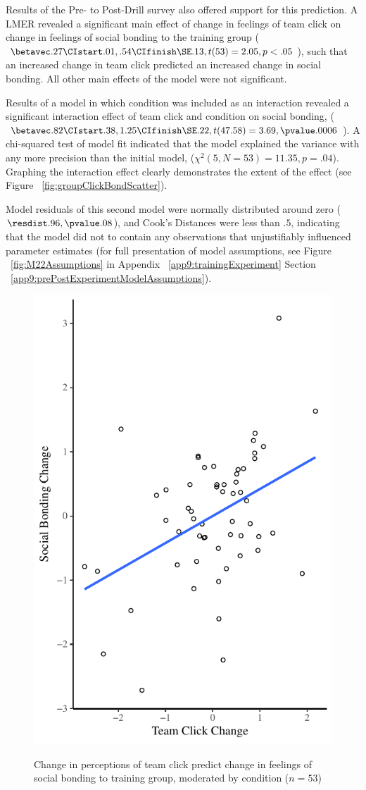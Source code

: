 
Results of the Pre- to Post-Drill survey also offered support for this prediction.  A LMER revealed a significant main effect of change in feelings of team click on change in feelings of social bonding to the training group ($\betavec .27 \CIstart .01, .54 \CIfinish \SE .13, t(53) = 2.05, p < .05$), such that an increased change in team click predicted an increased change in social bonding.  All other main effects of the model were not significant.

Results of a model in which condition was included as an interaction revealed a significant interaction effect of team click and condition on social bonding, ($\betavec .82 \CIstart .38, 1.25 \CIfinish \SE .22, t(47.58) = 3.69, \pvalue .0006$).  A chi-squared test of model fit indicated that the model explained the variance with any more precision than the initial model, ($\chi^2 (5, N = 53) = 11.35, p = .04$).  Graphing the interaction effect clearly demonstrates the extent of the effect (see Figure ~\ref{fig:groupClickBondScatter}).

Model residuals of this second model were normally distributed around zero ($\resdist .96, \pvalue .08$), and Cook's Distances were less than $.5$, indicating that the model did not to contain any observations that unjustifiably influenced parameter estimates (for full presentation of model assumptions, see Figure ~\ref{fig:M22Assumptions} in Appendix ~\ref{app9:trainingExperiment} Section ~\ref{app9:prePostExperimentModelAssumptions}).




\begin{figure}
  \centering
    \includegraphics[width=0.5\linewidth,keepaspectratio] {images/groupClickBondingChangeCondition}
    \label{fig:groupClickBondingChangeCondition}
    \caption{Change in perceptions of team click predict change in feelings of social bonding to training group, moderated by condition ($n = 53$)}
\end{figure}

